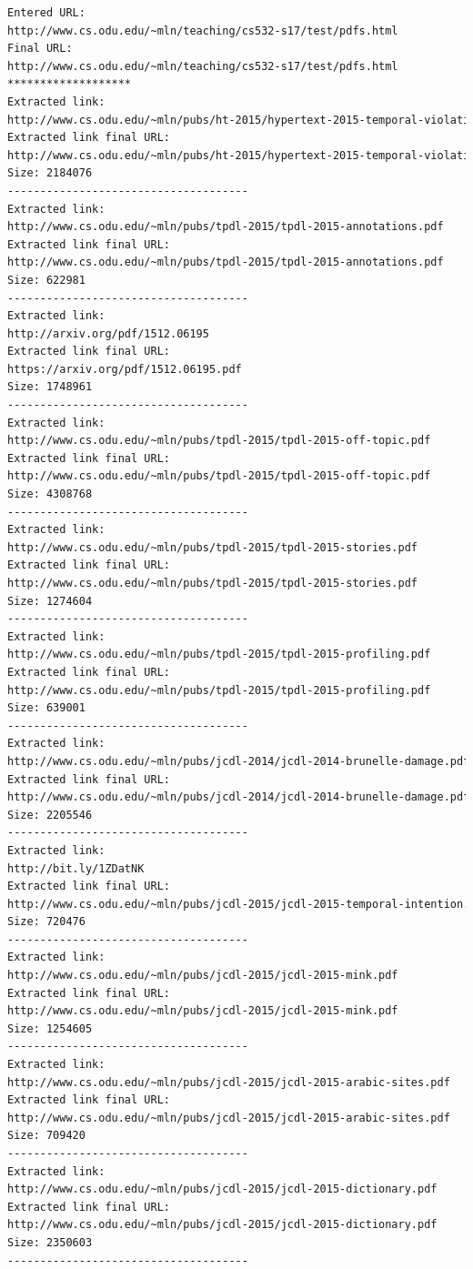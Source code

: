 \documentclass[a4paper, 11pt]{article}
\begin{document}
\begin{lstlisting}[language=bash]
Entered URL:
http://www.cs.odu.edu/~mln/teaching/cs532-s17/test/pdfs.html
Final URL:
http://www.cs.odu.edu/~mln/teaching/cs532-s17/test/pdfs.html
*******************
Extracted link:
http://www.cs.odu.edu/~mln/pubs/ht-2015/hypertext-2015-temporal-violations.pdf
Extracted link final URL:
http://www.cs.odu.edu/~mln/pubs/ht-2015/hypertext-2015-temporal-violations.pdf
Size: 2184076
-------------------------------------
Extracted link:
http://www.cs.odu.edu/~mln/pubs/tpdl-2015/tpdl-2015-annotations.pdf
Extracted link final URL:
http://www.cs.odu.edu/~mln/pubs/tpdl-2015/tpdl-2015-annotations.pdf
Size: 622981
-------------------------------------
Extracted link:
http://arxiv.org/pdf/1512.06195
Extracted link final URL:
https://arxiv.org/pdf/1512.06195.pdf
Size: 1748961
-------------------------------------
Extracted link:
http://www.cs.odu.edu/~mln/pubs/tpdl-2015/tpdl-2015-off-topic.pdf
Extracted link final URL:
http://www.cs.odu.edu/~mln/pubs/tpdl-2015/tpdl-2015-off-topic.pdf
Size: 4308768
-------------------------------------
Extracted link:
http://www.cs.odu.edu/~mln/pubs/tpdl-2015/tpdl-2015-stories.pdf
Extracted link final URL:
http://www.cs.odu.edu/~mln/pubs/tpdl-2015/tpdl-2015-stories.pdf
Size: 1274604
-------------------------------------
Extracted link:
http://www.cs.odu.edu/~mln/pubs/tpdl-2015/tpdl-2015-profiling.pdf
Extracted link final URL:
http://www.cs.odu.edu/~mln/pubs/tpdl-2015/tpdl-2015-profiling.pdf
Size: 639001
-------------------------------------
Extracted link:
http://www.cs.odu.edu/~mln/pubs/jcdl-2014/jcdl-2014-brunelle-damage.pdf
Extracted link final URL:
http://www.cs.odu.edu/~mln/pubs/jcdl-2014/jcdl-2014-brunelle-damage.pdf
Size: 2205546
-------------------------------------
Extracted link:
http://bit.ly/1ZDatNK
Extracted link final URL:
http://www.cs.odu.edu/~mln/pubs/jcdl-2015/jcdl-2015-temporal-intention.pdf
Size: 720476
-------------------------------------
Extracted link:
http://www.cs.odu.edu/~mln/pubs/jcdl-2015/jcdl-2015-mink.pdf
Extracted link final URL:
http://www.cs.odu.edu/~mln/pubs/jcdl-2015/jcdl-2015-mink.pdf
Size: 1254605
-------------------------------------
Extracted link:
http://www.cs.odu.edu/~mln/pubs/jcdl-2015/jcdl-2015-arabic-sites.pdf
Extracted link final URL:
http://www.cs.odu.edu/~mln/pubs/jcdl-2015/jcdl-2015-arabic-sites.pdf
Size: 709420
-------------------------------------
Extracted link:
http://www.cs.odu.edu/~mln/pubs/jcdl-2015/jcdl-2015-dictionary.pdf
Extracted link final URL:
http://www.cs.odu.edu/~mln/pubs/jcdl-2015/jcdl-2015-dictionary.pdf
Size: 2350603
-------------------------------------

\end{lstlisting}
\end{document}
